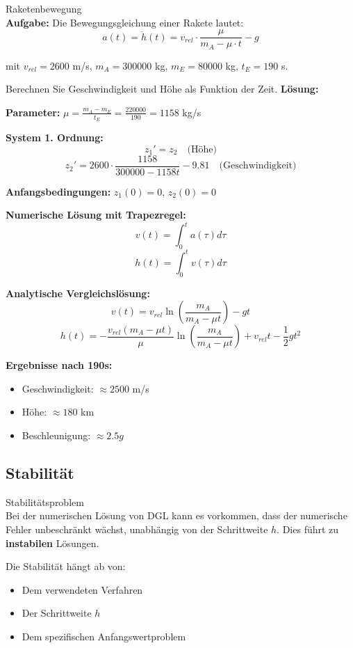 \begin{example2}{Raketenbewegung}\\
\textbf{Aufgabe:} Die Bewegungsgleichung einer Rakete lautet:
$$a(t) = \ddot{h}(t) = v_{rel} \cdot \frac{\mu}{m_A - \mu \cdot t} - g$$

mit $v_{rel} = 2600$ m/s, $m_A = 300000$ kg, $m_E = 80000$ kg, $t_E = 190$ s.

Berechnen Sie Geschwindigkeit und Höhe als Funktion der Zeit.
\tcblower
\textbf{Lösung:}

\textbf{Parameter:} $\mu = \frac{m_A - m_E}{t_E} = \frac{220000}{190} = 1158$ kg/s

\textbf{System 1. Ordnung:}
$$z_1' = z_2 \quad \text{(Höhe)}$$
$$z_2' = 2600 \cdot \frac{1158}{300000 - 1158t} - 9.81 \quad \text{(Geschwindigkeit)}$$

\textbf{Anfangsbedingungen:} $z_1(0) = 0$, $z_2(0) = 0$

\textbf{Numerische Lösung mit Trapezregel:}
$$v(t) = \int_0^t a(\tau) d\tau$$
$$h(t) = \int_0^t v(\tau) d\tau$$

\textbf{Analytische Vergleichslösung:}
$$v(t) = v_{rel} \ln\left(\frac{m_A}{m_A - \mu t}\right) - gt$$
$$h(t) = -\frac{v_{rel}(m_A - \mu t)}{\mu} \ln\left(\frac{m_A}{m_A - \mu t}\right) + v_{rel} t - \frac{1}{2}gt^2$$

\textbf{Ergebnisse nach 190s:}
\begin{itemize}
    \item Geschwindigkeit: $\approx 2500$ m/s
    \item Höhe: $\approx 180$ km
    \item Beschleunigung: $\approx 2.5g$
\end{itemize}
\end{example2}

\subsection{Stabilität}

\begin{concept}{Stabilitätsproblem}\\
Bei der numerischen Lösung von DGL kann es vorkommen, dass der numerische Fehler unbeschränkt wächst, unabhängig von der Schrittweite $h$. Dies führt zu \textbf{instabilen} Lösungen.

Die Stabilität hängt ab von:
\begin{itemize}
    \item Dem verwendeten Verfahren
    \item Der Schrittweite $h$
    \item Dem spezifischen Anfangswertproblem
\end{itemize}
\end{concept}


